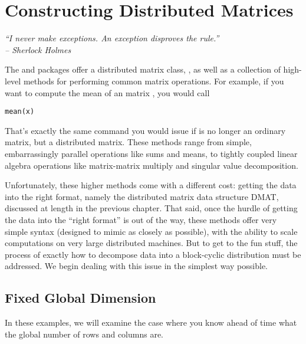 
\chapter{Constructing Distributed Matrices}


{\it
``I never make exceptions. An exception disproves the rule.'' \\
\--- Sherlock Holmes
}
\vspace{0.5cm}


The  and  packages offer a distributed matrix class,
,
as well as a collection of high-level methods for performing common matrix 
operations.  For example, if you want to compute the mean of an  
matrix , you would call 
\begin{lstlisting}[language=rr]
mean(x)
\end{lstlisting}
That's exactly the same command you would issue if  is no longer an 
ordinary  matrix, but a distributed matrix.  These methods range 
from simple, embarrassingly parallel operations like sums and means, to tightly 
coupled linear algebra operations like matrix-matrix multiply and singular value 
decomposition.

Unfortunately, these higher methods come with a different cost:  getting the 
data into the right format, namely the distributed matrix data structure DMAT, 
discussed at length in the previous chapter.  That said, once the hurdle of 
getting the data into the ``right format'' is out of the way, these methods 
offer very simple syntax (designed to mimic  as closely as 
possible), with the ability to scale computations on very large distributed 
machines.  But to get to the fun stuff, the process of exactly how to decompose 
data into a block-cyclic distribution must be addressed.  We begin dealing with 
this issue in the simplest way possible.  




\section{Fixed Global Dimension}

In these examples, we will examine the case where you know ahead of time what 
the global number of rows and columns are.

